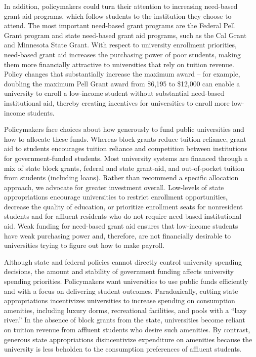 \documentclass{article}
\begin{document}
In addition, policymakers could turn their attention to increasing need-based grant aid programs, which follow students to the institution they choose to attend. The most important need-based grant programs are the Federal Pell Grant program and state need-based grant aid programs, such as the Cal Grant and Minnesota State Grant. With respect to university enrollment priorities, need-based grant aid increases the purchasing power of poor students, making them more financially attractive to universities that rely on tuition revenue. Policy changes that substantially increase the maximum award -- for example, doubling the maximum Pell Grant award from \$6,195 to \$12,000 can enable a university to enroll a low-income student without substantial need-based institutional aid, thereby creating incentives for universities to enroll more low-income students. 

Policymakers face choices about how generously to fund public universities and how to allocate these funds. Whereas block grants reduce tuition reliance, grant aid to students encourages tuition reliance and competition between institutions for government-funded students.  Most university systems are financed through a mix of state block grants, federal and state grant-aid, and out-of-pocket tuition from students (including loans). Rather than recommend a specific allocation approach, we advocate for greater investment overall.  Low-levels of state appropriations encourage universities to restrict enrollment opportunities, decrease the quality of education, or prioritize enrollment seats for nonresident students and for affluent residents who do not require need-based institutional aid. Weak funding for need-based grant aid ensures that low-income students have weak purchasing power and, therefore, are not financially desirable to universities trying to figure out how to make payroll.


Although state and federal policies cannot directly control university spending decisions, the amount and stability of government funding affects university spending priorities. Policymakers want universities to use public funds efficiently and with a focus on delivering student outcomes. Paradoxically, cutting state appropriations incentivizes universities to increase spending on consumption amenities, including luxury dorms, recreational facilities, and pools with a ``lazy river.'' In the absence of block grants from the state, universities become reliant on tuition revenue from affluent students who desire such amenities. By contrast, generous state appropriations disincentivize expenditure on amenities because the university is less beholden to the consumption preferences of affluent students. 
\end{document}
